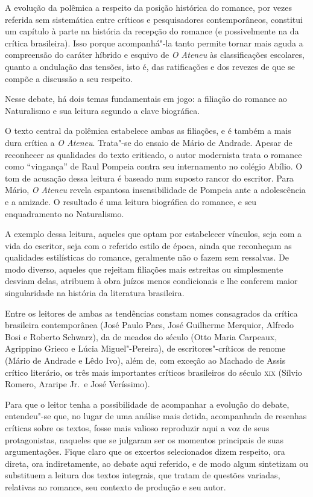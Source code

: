 A evolução da polêmica a respeito da posição histórica
do romance, por vezes referida sem sistemática entre críticos e
pesquisadores contemporâneos, constitui um capítulo à parte na história
da recepção do romance (e possivelmente na da crítica brasileira). Isso
porque acompanhá"-la  tanto permite tornar mais aguda a compreensão do
caráter híbrido e esquivo de \textit{O Ateneu} às classificações escolares, quanto a
ondulação das tensões, isto é, das ratificações e dos revezes de que se
compõe a discussão a seu respeito. 

Nesse debate, há dois temas fundamentais em jogo: a filiação do romance
ao Naturalismo e sua leitura segundo a clave biográfica. 

O texto central da polêmica estabelece ambas as filiações, e é também a
mais dura crítica a \textit{O Ateneu}. Trata"-se do ensaio de Mário de
Andrade. Apesar de reconhecer as qualidades do texto criticado, o autor
modernista trata o romance como ``vingança'' de Raul Pompeia contra seu
internamento no colégio Abílio. O tom de acusação dessa leitura é
baseado num suposto rancor do escritor. Para Mário, \textit{O Ateneu}
revela espantosa insensibilidade de Pompeia ante a adolescência e a
amizade. O resultado é uma leitura biográfica do romance, e seu
enquadramento no Naturalismo. 

A exemplo dessa leitura, aqueles que optam por estabelecer vínculos,
seja com a vida do escritor, seja com o referido estilo de época, ainda
que reconheçam as qualidades estilísticas do romance, geralmente não o
fazem sem ressalvas. De modo diverso, aqueles que rejeitam filiações
mais estreitas ou simplesmente desviam delas, atribuem à obra juízos
menos condicionais e lhe conferem maior singularidade na história da
literatura brasileira.

Entre os leitores de ambas as tendências constam nomes consagrados da
crítica brasileira contemporânea (José Paulo Paes, José Guilherme
Merquior, Alfredo Bosi e Roberto Schwarz), da de meados do século (Otto
Maria Carpeaux, Agrippino Grieco e Lúcia Miguel"-Pereira), de
escritores"-críticos de renome (Mário de Andrade e Lêdo Ivo), além de,
com exceção ao Machado de Assis crítico literário, os três mais
importantes críticos brasileiros do século \textsc{xix} (Sílvio Romero, Araripe
Jr.~e José Veríssimo).

Para que o leitor tenha a possibilidade de acompanhar a evolução do
debate, entendeu"-se que, no lugar de uma análise mais detida,
acompanhada de resenhas críticas sobre os textos, fosse mais valioso
reproduzir aqui a voz de seus protagonistas, naqueles que se julgaram
ser os momentos principais de suas argumentações. Fique claro que os
excertos selecionados dizem respeito, ora direta, ora indiretamente, ao
debate aqui referido, e de modo algum sintetizam ou substituem a
leitura dos textos integrais, que tratam de questões variadas,
relativas ao romance, seu contexto de produção e seu autor.

